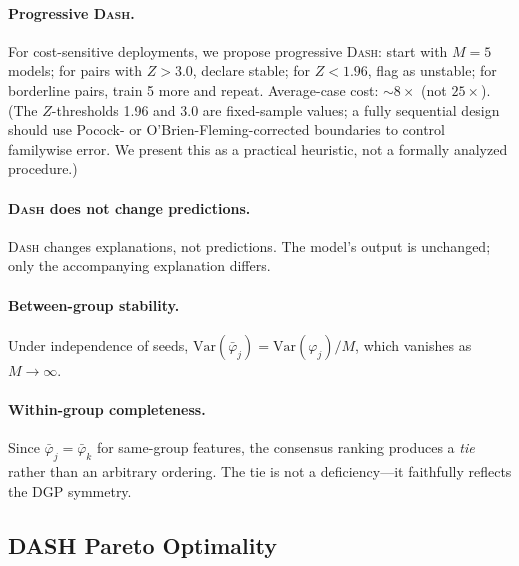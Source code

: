 \documentclass{jmlr}
\newcommand{\Var}{\mathrm{Var}}
\newcommand{\DASH}{\textsc{Dash}}
\begin{document}
\paragraph{Progressive \DASH{}.}
For cost-sensitive deployments, we propose progressive \DASH{}: start with $M{=}5$ models; for pairs with $Z > 3.0$, declare stable; for $Z < 1.96$, flag as unstable; for borderline pairs, train 5 more and repeat. Average-case cost: ${\sim}8\times$ (not $25\times$).
(The $Z$-thresholds 1.96 and 3.0 are fixed-sample values; a fully sequential design should use Pocock- or O'Brien-Fleming-corrected boundaries to control familywise error. We present this as a practical heuristic, not a formally analyzed procedure.)

\paragraph{\DASH{} does not change predictions.}
\DASH{} changes explanations, not predictions. The model's output is unchanged; only the accompanying explanation differs.

\paragraph{Between-group stability.}
Under independence of seeds, $\Var(\bar{\varphi}_j) = \Var(\varphi_j) / M$, which vanishes as $M \to \infty$.

\paragraph{Within-group completeness.}
Since $\bar{\varphi}_j = \bar{\varphi}_k$ for same-group features, the consensus ranking produces a \emph{tie} rather than an arbitrary ordering. The tie is not a deficiency---it faithfully reflects the DGP symmetry.

\subsection{DASH Pareto Optimality}
\label{sec:dash-pareto}
\end{document}
